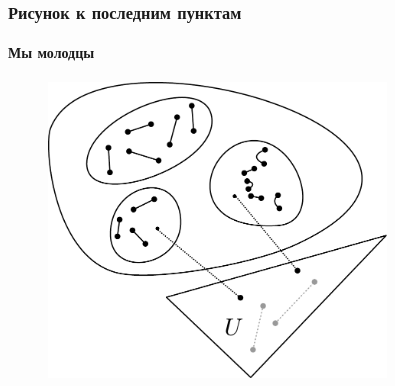 \begin{frame}[t]
    \frametitle{Рисунок к последним пунктам}
    \framesubtitle{Мы молодцы}
    \begin{figure}[h]
        \centering
        \includegraphics[width=0.8\textwidth]{images/final}
        \label{fig:final}
    \end{figure}
\end{frame}
